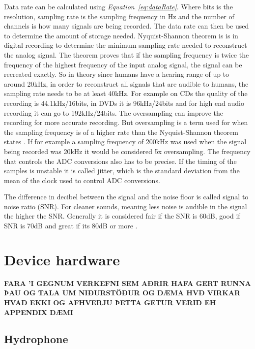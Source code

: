 Data rate can be calculated using \textit{Equation~\ref{eq:dataRate}}.
Where bits is the resolution, sampling rate is the sampling frequency in Hz and the number of channels is how many signals are being recorded.
The data rate can then be used to determine the amount of storage needed.
Nyquist-Shannon theorem is is in digital recording to determine the minimum sampling rate needed to reconstruct the analog signal.
The theorem proves that if the sampling frequency is twice the frequency of the highest frequency of the input analog signal, the signal can be recreated exactly.%
So in theory since humans have a hearing range of up to around 20kHz, in order to reconstruct all signals that are audible to humans, the sampling rate needs to be at least 40kHz.
For example on CDs the quality of the recording is 44.1kHz/16bits, in DVDs it is 96kHz/24bits and for high end audio recording it can go to 192kHz/24bits.
The oversampling can improve the recording for more accurate recording.
But oversampling is a term used for when the sampling frequency is of a higher rate than the Nyquist-Shannon theorem states  \cite{bartlett_practical_2016}.
If for example a sampling frequency of 200kHz was used when the signal being recorded was 20kHz it would be considered 5x oversampling.
The frequency that controls the ADC conversions also has to be precise.
If the timing of the samples is unstable it is called jitter, which is the standard deviation from the mean of the clock used to control ADC conversions.

The difference in decibel between the signal and the noise floor is called signal to noise ratio (SNR). 
For cleaner sounds, meaning less noise is audible in the signal the higher the SNR.
Generally it is considered fair if the SNR is 60dB, good if SNR is 70dB and great if its 80dB or more \cite{bartlett_practical_2016}.


\section{Device hardware}

\textbf{FARA 'I GEGNUM VERKEFNI SEM AÐRIR HAFA GERT RUNNA ÞAU OG TALA UM NIÐURSTÖÐUR OG DÆMA HVÐ VIRKAR HVAÐ EKKI OG AFHVERJU ÞETTA GETUR VERIÐ EH APPENDIX DÆMI
}

\subsection{Hydrophone}

